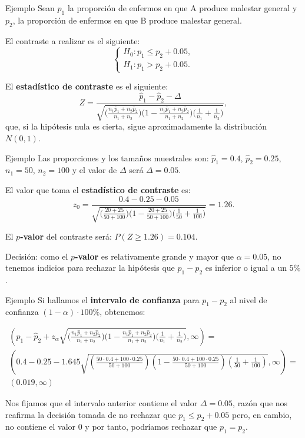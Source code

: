 \documentclass[
  ignorenonframetext,
]{beamer}
\begin{document}
\begin{frame}{Ejemplo}
\protect\hypertarget{ejemplo-45}{}
Sean \(p_1\) la proporción de enfermos en que A produce malestar general
y \(p_2\), la proporción de enfermos en que B produce malestar general.

El contraste a realizar es el siguiente: \[
\left\{\begin{array}{l}
H_0:p_1\leq p_2+0.05,\\
H_1:p_1>p_2+0.05.
\end{array}\right.
\]

El \textbf{estadístico de contraste} es el siguiente: \[
Z=\frac{\widehat{p}_1 -\widehat{p}_2-\Delta}{
\sqrt{\Big(\frac{n_1 \widehat{p}_1 +n_2 \widehat{p}_2}{n_1
+n_2}\Big)\Big(1-\frac{n_1 \widehat{p}_1 +n_2 \widehat{p}_2}{n_1
+n_2}\Big)\Big(\frac1{n_1}+\frac1{n_2}
\Big)}},
\] que, si la hipótesis nula es cierta, sigue aproximadamente la
distribución \(N(0,1)\).
\end{frame}

\begin{frame}{Ejemplo}
\protect\hypertarget{ejemplo-46}{}
Las proporciones y los tamaños muestrales son: \(\widehat{p}_1=0.4\),
\(\widehat{p}_2=0.25\), \(n_1=50\), \(n_2=100\) y el valor de \(\Delta\)
será \(\Delta=0.05\).

El valor que toma el \textbf{estadístico de contraste} es: \[
z_0=\frac{0.4-0.25-0.05}{
\sqrt{\Big(\frac{20+25}{50+100}\Big)\Big(1-\frac{20+25}{50+100}\Big)\Big(\frac1{50}+\frac1{100}\Big)}}=1.26.
\]

El \textbf{\(p\)-valor} del contraste será: \(P(Z\geq 1.26)= 0.104.\)

Decisión: como el \textbf{\(p\)-valor} es relativamente grande y mayor
que \(\alpha=0.05\), no tenemos indicios para rechazar la hipótesis que
\(p_1-p_2\) es inferior o igual a un \(5\%\).
\end{frame}

\begin{frame}{Ejemplo}
\protect\hypertarget{ejemplo-47}{}
Si hallamos el \textbf{intervalo de confianza} para \(p_1-p_2\) al nivel
de confianza \((1-\alpha)\cdot 100\%\), obtenemos:

\[
\begin{array}{l}
\left(\widehat{p}_1-\widehat{p}_2+z_{\alpha}\sqrt{\Big(\frac{n_1 \widehat{p}_1 +n_2 \widehat{p}_2}{n_1
+n_2}\Big)\Big(1-\frac{n_1 \widehat{p}_1 +n_2 \widehat{p}_2}{n_1
+n_2}\Big)\Big(\frac1{n_1}+\frac1{n_2}
\Big)},\infty
\right) =  \\
\left(0.4-0.25 -1.645\sqrt{\left(\frac{50 \cdot 0.4 +100\cdot 0.25}{50
+100}\right)\left(1-\frac{50 \cdot 0.4 +100\cdot 0.25}{50
+100}\right)\left(\frac1{50}+\frac1{100}\right)},\infty\right) = \\
(0.019,\infty)
\end{array}
\]

Nos fijamos que el intervalo anterior contiene el valor
\(\Delta =0.05\), razón que nos reafirma la decisión tomada de no
rechazar que \(p_1\leq p_2+ 0.05\) pero, en cambio, no contiene el valor
\(0\) y por tanto, podríamos rechazar que \(p_1=p_2\).
\end{frame}
\end{document}
